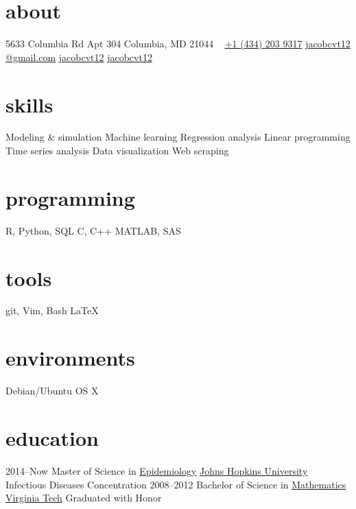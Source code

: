 \documentclass[]{friggeri-cv} %
\begin{document}



\begin{aside} %
\section{about}
5633 Columbia Rd
Apt 304
Columbia, MD 21044
~
\href{tel:14342039317}{\faPhone +1 (434) 203 9317}
\href{mailto:jacobcvt12@gmail.com}{\faEnvelope jacobcvt12}
\href{mailto:jacobcvt12@gmail.com}{@gmail.com}
\href{https://github.com/jacobcvt12}{\faGithub jacobcvt12}
\href{https://www.linkedin.com/in/jacobcvt12}{\faLinkedin jacobcvt12}
\section{skills}
Modeling \& simulation
Machine learning
Regression analysis
Linear programming
Time series analysis
Data visualization
Web scraping
\section{programming}
R, Python, SQL
C, C++
MATLAB, SAS
\section{tools}
git, Vim, Bash
\LaTeX
\section{environments}
Debian/Ubuntu
OS X
\end{aside}


\section{education}

\begin{entrylist}
\entry
{2014--Now}
{Master {\normalfont of Science in}
\href{http://www.jhsph.edu/departments/epidemiology/}{Epidemiology}}
{\href{http://www.jhu.edu}{Johns Hopkins University}}
{Infectious Diseases Concentration}
\entry
{2008--2012}
{Bachelor {\normalfont of Science in}
\href{https://www.math.vt.edu/}{Mathematics}}
{\href{http://www.vt.edu}{Virginia Tech}}
{Graduated with Honor}
\end{entrylist}
\end{document}

